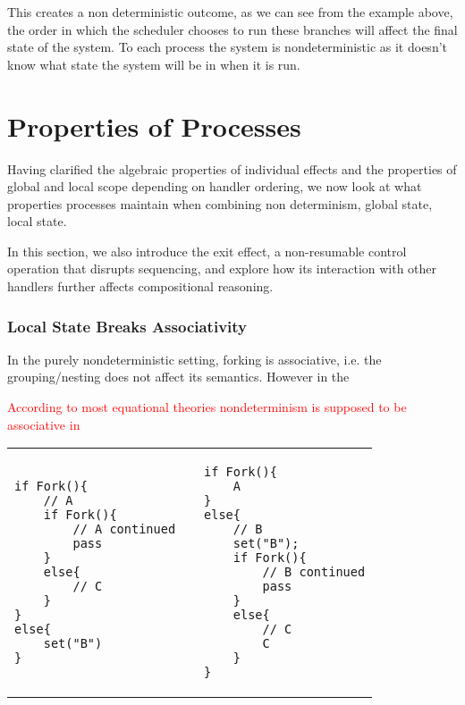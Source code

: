 \documentclass[logo,bsc,singlespacing,parskip]{infthesis}
\begin{document}
This creates a non deterministic outcome, as we can see from the example above, the order in which the scheduler chooses to run these branches will affect the final state of the system. To each process the system is nondeterministic as it doesn't know what state the system will be in when it is run. 




\section{Properties of Processes}

Having clarified the algebraic properties of individual effects and the properties of global and local scope depending on handler ordering, we now look at what properties processes maintain when combining  non determinism, global state, local state.

In this section, we also introduce the exit effect, a non-resumable control operation that disrupts sequencing, and explore how its interaction with other handlers further affects compositional reasoning.


\subsubsection*{Local State Breaks Associativity}

In the purely nondeterministic setting, forking is associative, i.e. the grouping/nesting does not affect its semantics. However in the 

\textcolor{red}{According to most equational theories nondeterminism is supposed to be associative in }

\begin{table}[H]
\centering
\begin{tabular}{p{} c p{}}
\begin{lstlisting}
if Fork(){
    // A
    if Fork(){
        // A continued
        pass
    }
    else{
        // C
    }
}
else{
    set("B")
}
\end{lstlisting}
&
&
\begin{lstlisting}
if Fork(){
    A
} 
else{
    // B
    set("B");
    if Fork(){
        // B continued
        pass
    }
    else{
        // C
        C
    }
}
\end{lstlisting}
\end{tabular}
\end{table}
\vspace{-2em}
\end{document}
